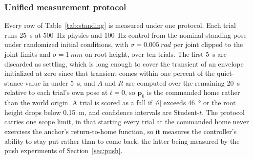 \documentclass[a4paper,fleqn]{cas-dc}
\begin{document}
\subsubsection{Unified measurement protocol}

Every row of Table~\ref{tab:standing} is measured under one protocol. Each trial
runs \SI{25}{s} at \SI{500}{Hz} physics and \SI{100}{Hz} control from the nominal
standing pose under randomized initial conditions, with
$\sigma{=}\SI{0.005}{rad}$ per joint clipped to the joint limits and
$\sigma{=}\SI{1}{mm}$ on root height, over ten trials. The first \SI{5}{s} are
discarded as settling, which is long enough to cover the transient of an envelope
initialized at zero since that transient comes within one percent of the
quiet-stance value in under \SI{5}{s}, and $A$ and $R$ are computed over the
remaining \SI{20}{s} relative to each trial's own pose at $t{=}0$, so
$\mathbf{p}_0$ is the commanded home rather than the world origin. A trial is
scored as a fall if $|\theta|$ exceeds \SI{46}{\degree} or the root height drops
below \SI{0.15}{m}, and confidence intervals are Student-$t$. The protocol
carries one scope limit, in that starting every trial at the commanded home never
exercises the anchor's return-to-home function, so it measures the controller's
ability to stay put rather than to come back, the latter being measured by the
push experiments of Section~\ref{sec:push}.
\end{document}
